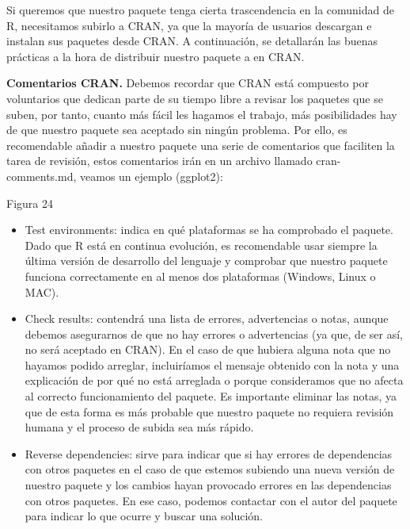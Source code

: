 Si queremos que nuestro paquete tenga cierta trascendencia en la comunidad de R,
necesitamos subirlo a CRAN, ya que la mayor\'ia de usuarios descargan e instalan sus
paquetes desde CRAN.
A continuaci\'on, se detallar\'an las buenas pr\'acticas a la hora de distribuir nuestro paquete a
en CRAN.


\textbf{Comentarios CRAN.}
Debemos recordar que CRAN est\'a compuesto por voluntarios que dedican parte de su tiempo
libre a revisar los paquetes que se suben, por tanto, cuanto m\'as f\'acil les hagamos el trabajo,
m\'as posibilidades hay de que nuestro paquete sea aceptado sin ning\'un problema.
Por ello, es recomendable a\~nadir a nuestro paquete una serie de comentarios que faciliten la
tarea de revisi\'on, estos comentarios ir\'an en un archivo llamado cran-comments.md, veamos
un ejemplo (ggplot2):

Figura 24

\begin{itemize}

    \item Test environments: indica en qu\'e plataformas se ha comprobado el paquete. Dado
que R est\'a en continua evoluci\'on, es recomendable usar siempre la \'ultima versi\'on de
desarrollo del lenguaje y comprobar que nuestro paquete funciona correctamente en
al menos dos plataformas (Windows, Linux o MAC).
    \item Check results: contendr\'a una lista de errores, advertencias o notas, aunque debemos
asegurarnos de que no hay errores o advertencias (ya que, de ser as\'i, no ser\'a
aceptado en CRAN).
En el caso de que hubiera alguna nota que no hayamos podido arreglar, incluir\'iamos
el mensaje obtenido con la nota y una explicaci\'on de por qu\'e no est\'a arreglada o
porque consideramos que no afecta al correcto funcionamiento del paquete.
Es importante eliminar las notas, ya que de esta forma es m\'as probable que nuestro
paquete no requiera revisi\'on humana y el proceso de subida sea m\'as r\'apido.
    \item Reverse dependencies: sirve para indicar que si hay errores de dependencias con
otros paquetes en el caso de que estemos subiendo una nueva versi\'on de nuestro
paquete y los cambios hayan provocado errores en las dependencias con otros
paquetes. En ese caso, podemos contactar con el autor del paquete para indicar lo
que ocurre y buscar una soluci\'on.
\end{itemize}

